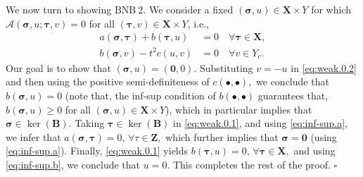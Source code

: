 \documentclass[11pt, reqno, a4paper, twoside]{article}
\newcommand\bsigma{\boldsymbol{\sigma}}
\newcommand\bzero{\boldsymbol{0}}
\newcommand\btau{\boldsymbol{\tau}}
\newcommand{\bB}{\mathbf{B}}
\newcommand{\bX}{\mathbf{X}}
\newcommand{\bZ}{\mathbf{Z}}
\newenvironment{proof}{\noindent{\it Proof.}}{\hfill$\square$}
\numberwithin{equation}{section}
\numberwithin{remark}{section}
\numberwithin{figure}{section}
\numberwithin{table}{section}
\begin{document}
\begin{proof}
{We now turn to showing \(\mathrm{BNB}~2\). We consider a fixed \((\bsigma,u)\in \bX\times Y\) for which \(\mathcal{A}(\bsigma,u;\btau,v)= 0\) {for all $(\btau,v) \in \bX\times Y$}, i.e., 
\begin{subequations}\label{eq:abstract.0}
    \begin{align}
    a(\bsigma,\btau) + b(\btau,u) & = 0 \quad \forall \btau \in \bX, \label{eq:weak.0.1}\\
    b(\bsigma, v) - t^2c(u,v) & = 0\label{eq:weak.0.2} \quad \forall v\in {Y_c}.
\end{align}\end{subequations}
Our goal is to show that \((\bsigma,u)=(\bzero,0).\) 
Substituting \(v=-u\) in \eqref{eq:weak.0.2} and then using the positive semi-definiteness of \(c(\bullet,\bullet),\) we conclude that \(b(\bsigma,u)=0\) (note that, the inf-sup condition of \(b(\bullet,\bullet)\) guarantees that, \(b(\bsigma,u)\geq 0\) for all \((\bsigma, u) \in \bX \times Y\)), which in particular implies that \(\bsigma\in\ker(\bB)\).
Taking \(\btau\in\ker(\bB)\) in \eqref{eq:weak.0.1}, and using \eqref{eq:inf-sup.a}, we infer that \(a(\bsigma,\btau)=0,\,\forall\tau\in\bZ,\) which further implies that \(\bsigma=\bzero\) (using \eqref{eq:inf-sup.a}). Finally, \eqref{eq:weak.0.1} yields \(b(\btau,u)=0,\,\forall \btau\in \bX,\)  and using \eqref{eq:inf-sup.b}, we conclude that \(u=0\).} This completes the rest of the proof.
\end{proof}
\end{document}
